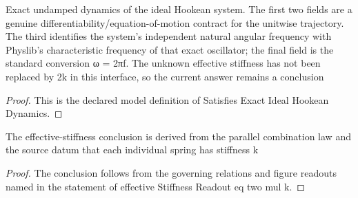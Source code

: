 \begin{definition}
  \label{def:physics:phyx-mini-0203:phyxminiproblems-problemphyxmini0203-satisfiesexactidealhookeandynamics}
  Exact undamped dynamics of the ideal Hookean system. The first two fields are a genuine differentiability/equation-of-motion contract for the unitwise trajectory. The third identifies the system's independent natural angular frequency with Physlib's characteristic frequency of that exact oscillator; the final field is the standard conversion ω = 2πf. The unknown effective stiffness has not been replaced by 2k in this interface, so the current answer remains a conclusion
\end{definition}
\begin{proof}
  This is the declared model definition of Satisfies Exact Ideal Hookean Dynamics.
\end{proof}
\begin{lemma}
  \label{lem:physics:phyx-mini-0203:phyxminiproblems-problemphyxmini0203-effectivestiffnessreadout-eq-two-mul-k}
  The effective-stiffness conclusion is derived from the parallel combination law and the source datum that each individual spring has stiffness k
\end{lemma}
\begin{proof}
  The conclusion follows from the governing relations and figure readouts named in the statement of effective Stiffness Readout eq two mul k.
\end{proof}
